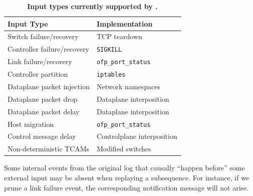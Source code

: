 \begin{table}[tb]
\centering
\footnotesize
\begin{tabular}{|l|l|}
\hline
\textbf{Input Type} & \textbf{Implementation} \\
\hline
\hline
Switch failure/recovery & TCP teardown \\
\hline
Controller failure/recovery & \verb=SIGKILL= \\
\hline
Link failure/recovery & \verb=ofp_port_status= \\
\hline
Controller partition & \verb=iptables= \\
\hline
Dataplane packet injection & Network namespaces \\
\hline
Dataplane packet drop & Dataplane interposition \\
\hline
Dataplane packet delay & Dataplane interposition \\
\hline
Host migration & \verb=ofp_port_status= \\
\hline
Control message delay & Controlplane interposition \\
\hline
Non-deterministic TCAMs & Modified switches \\
\hline
\end{tabular}
\caption{\textbf{Input types currently supported by \projectname.}}
\label{tab:inputs}
\vspace{-0.3cm}
\end{table}


 Some internal events from the original
log that causally ``happen before'' some external input
may be absent when replaying a subsequence.
For instance, if we prune a link failure event,
the corresponding notification message will not arise.

